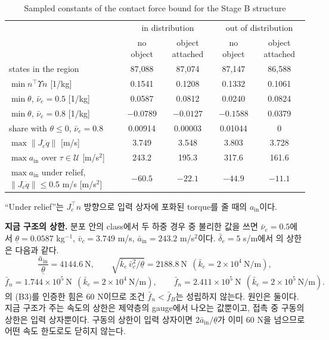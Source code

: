 \documentclass[11pt]{article}\usepackage[margin=1in]{geometry}\usepackage{amsmath,amssymb,amsthm,mathtools}\usepackage{graphicx}\graphicspath{{figures/}{../figures/}{figs/}{./}}\usepackage{enumitem}\usepackage{hyperref}\usepackage{cleveref}\usepackage{tikz}\usetikzlibrary{arrows.meta,positioning,calc,shapes.geometric}\usepackage{float}\usepackage{rotating}\usepackage[most]{tcolorbox}\usepackage{kotex}\usepackage{booktabs}\usepackage{longtable}\emergencystretch=1.6em\tolerance=2000 \crefname{assumption}{Assumption}{Assumptions}\Crefname{assumption}{Assumption}{Assumptions}\crefname{definition}{Definition}{Definitions}\Crefname{definition}{Definition}{Definitions}\crefname{proposition}{Proposition}{Propositions}\Crefname{proposition}{Proposition}{Propositions}\crefname{fact}{Fact}{Facts}\Crefname{fact}{Fact}{Facts} \newtheorem{assumption}{Assumption}\newtheorem{definition}{Definition}\newtheorem{lemma}{Lemma}\newtheorem{proposition}{Proposition}\newtheorem{theorem}{Theorem}\newtheorem{corollary}{Corollary}\newtheorem{fact}{Fact}\theoremstyle{remark}\newtheorem{remark}{Remark} \newcommand{\R}{\mathbb{R}}\newcommand{\xb}{\bar x}\newcommand{\Ab}{\bar A}\newcommand{\By}{\bar B_y}\newcommand{\U}{\mathcal U}\newcommand{\Z}{\mathcal Z}
\begin{document}
\begin{table}[H]
\centering\footnotesize
\caption{Sampled constants of the contact force bound for the Stage B structure}
\label{tab:forceconst}
\begin{tabular}{lcccc}
\toprule
 & \multicolumn{2}{c}{in distribution} & \multicolumn{2}{c}{out of distribution} \\
 & no object & object attached & no object & object attached \\
\midrule
states in the region & 87{,}088 & 87{,}074 & 87{,}147 & 86{,}588 \\
$\min n^\top\Upsilon n$ [1/kg] & 0.1541 & 0.1208 & 0.1332 & 0.1061 \\
$\min\theta$, $\bar\nu_e=0.5$ [1/kg] & 0.0587 & 0.0812 & 0.0240 & 0.0824 \\
$\min\theta$, $\bar\nu_e=0.8$ [1/kg] & $-0.0789$ & $-0.0127$ & $-0.1588$ & 0.0379 \\
share with $\theta\le0$, $\bar\nu_e=0.8$ & 0.00914 & 0.00003 & 0.01044 & 0 \\
$\max\|J_c\dot q\|$ [m/s] & 3.749 & 3.548 & 3.803 & 3.728 \\
$\max a_{\mathrm{in}}$ over $\tau\in\U$ [m/s$^2$] & 243.2 & 195.3 & 317.6 & 161.6 \\
$\max a_{\mathrm{in}}$ under relief, $\|J_c\dot q\|\le0.5$ m/s [m/s$^2$] & $-60.5$ & $-22.1$ & $-44.9$ & $-11.1$ \\
\bottomrule
\end{tabular}
\end{table}

``Under relief''는 $J_c^\top n$ 방향으로 입력 상자에 포화된 torque를 줄 때의 $a_{\mathrm{in}}$이다.

\textbf{지금 구조의 상한.} 분포 안의 class에서 두 하중 경우 중 불리한 값을 쓰면 $\bar\nu_e=0.5$에서 $\underline\theta=0.0587$ kg$^{-1}$, $\bar v_c=3.749$ m/s, $\bar a_{\mathrm{in}}=243.2$ m/s$^2$이다. $\bar\delta_e=5$ s/m에서 의 상한은 다음과 같다.
\[
\frac{\bar a_{\mathrm{in}}}{\underline\theta}=4144.6\ \mathrm N,\qquad \sqrt{\bar k_e\,\bar v_c^2/\underline\theta}=2188.8\ \mathrm N\ \ (\bar k_e=2\times10^4\ \mathrm{N/m}),
\]
\[
\bar f_n=1.744\times10^5\ \mathrm N\ \ (\bar k_e=2\times10^4\ \mathrm{N/m}),\qquad \bar f_n=2.411\times10^5\ \mathrm N\ \ (\bar k_e=2\times10^5\ \mathrm{N/m}) .
\]
의 (B3)를 인증한 힘은 60 N이므로 조건 $\bar f_n<\bar f_B$는 성립하지 않는다. 원인은 둘이다. 지금 구조가 주는 속도의 상한은 제약층의 gauge에서 나오는 값뿐이고, 접촉 중 구동의 상한은 입력 상자뿐이다. 구동의 상한이 입력 상자이면 $2\bar a_{\mathrm{in}}/\underline\theta$가 이미 60 N을 넘으므로 어떤 속도 한도로도 닫히지 않는다.
\end{document}

